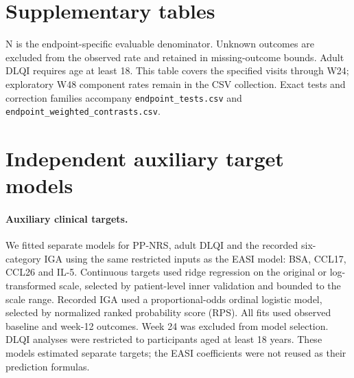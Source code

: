 \documentclass[10pt,a4paper]{article}
\begin{document}
\clearpage\setcounter{table}{0}\section*{Supplementary tables}
N is the endpoint-specific evaluable denominator. Unknown outcomes are excluded from the observed rate and retained in missing-outcome bounds. Adult DLQI requires age at least 18. This table covers the specified visits through W24; exploratory W48 component rates remain in the CSV collection. Exact tests and correction families accompany \texttt{endpoint\_tests.csv} and \texttt{endpoint\_weighted\_contrasts.csv}.
{\setlength{\parskip}{0pt}\small}
\clearpage

\clearpage
\clearpage{\small}
\clearpage
\clearpage
\clearpage
\clearpage
\clearpage
\clearpage
\clearpage
\clearpage
\clearpage
\clearpage
\clearpage
\clearpage
\clearpage
\clearpage
\clearpage
\clearpage
\section*{Independent auxiliary target models}
\paragraph{Auxiliary clinical targets.}
We fitted separate models for PP-NRS, adult DLQI and the recorded six-category IGA using the same restricted inputs as the EASI model: BSA, CCL17, CCL26 and IL-5. Continuous targets used ridge regression on the original or log-transformed scale, selected by patient-level inner validation and bounded to the scale range. Recorded IGA used a proportional-odds ordinal logistic model, selected by normalized ranked probability score (RPS). All fits used observed baseline and week-12 outcomes. Week 24 was excluded from model selection. DLQI analyses were restricted to participants aged at least 18 years. These models estimated separate targets; the EASI coefficients were not reused as their prediction formulas.
\end{document}
